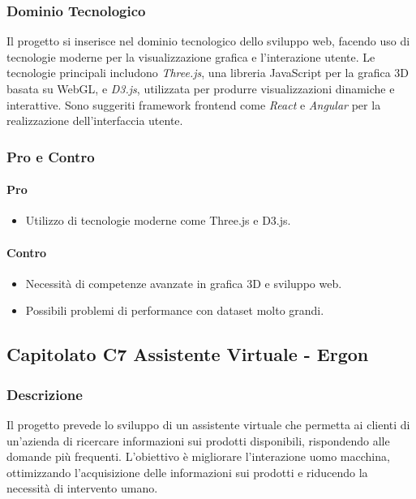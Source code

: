 \documentclass{article}
\begin{document}
\subsubsection{Dominio Tecnologico}
Il progetto si inserisce nel dominio tecnologico dello sviluppo web, 
facendo uso di tecnologie moderne per la visualizzazione grafica e l'interazione utente. 
Le tecnologie principali includono \textit{Three.js}, una libreria JavaScript per 
la grafica 3D basata su WebGL, e \textit{D3.js}, utilizzata per produrre visualizzazioni 
dinamiche e interattive. Sono suggeriti framework frontend come \textit{React} e \textit{Angular} 
per la realizzazione dell'interfaccia utente.

\subsubsection{Pro e Contro}

\paragraph{Pro}
\begin{itemize}
    \item Utilizzo di tecnologie moderne come Three.js e D3.js.
\end{itemize}

\paragraph{Contro}
\begin{itemize}
    \item Necessità di competenze avanzate in grafica 3D e sviluppo web.
    \item Possibili problemi di performance con dataset molto grandi.
\end{itemize}

\subsection{Capitolato C7 Assistente Virtuale - Ergon}

\subsubsection{Descrizione}
Il progetto prevede lo sviluppo di un assistente virtuale che permetta ai clienti 
di un'azienda di ricercare informazioni sui prodotti disponibili, 
rispondendo alle domande più frequenti. L'obiettivo è migliorare l'interazione uomo macchina, 
ottimizzando l'acquisizione delle informazioni sui prodotti e riducendo la necessità di intervento umano.
\end{document}
